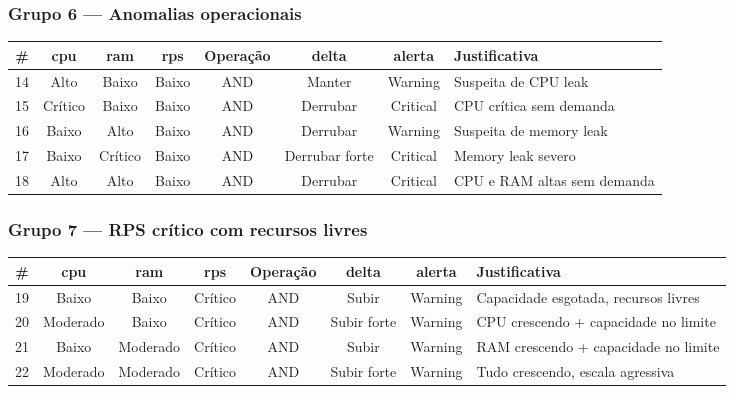 \documentclass[12pt, a4paper]{article}
\begin{document}
\subsubsection{Grupo 6 — Anomalias operacionais}
\begin{table}[H]
  \centering
  \begin{tabularx}{\textwidth}{cccccccX}
    \toprule
    \rowcolor{headerblue}
    \textbf{\#} & \textbf{cpu} & \textbf{ram} & \textbf{rps} & \textbf{Operação} & \textbf{delta} & \textbf{alerta} & \textbf{Justificativa} \\
    \midrule
    14 & Alto    & Baixo   & Baixo & AND & Manter         & Warning  & Suspeita de CPU leak \\
    15 & Crítico & Baixo   & Baixo & AND & Derrubar       & Critical & CPU crítica sem demanda \\
    16 & Baixo   & Alto    & Baixo & AND & Derrubar       & Warning  & Suspeita de memory leak \\
    17 & Baixo   & Crítico & Baixo & AND & Derrubar forte & Critical & Memory leak severo \\
    18 & Alto    & Alto    & Baixo & AND & Derrubar       & Critical & CPU e RAM altas sem demanda \\
    \bottomrule
  \end{tabularx}
\end{table}

\subsubsection{Grupo 7 — RPS crítico com recursos livres}
\begin{table}[H]
  \centering
  \begin{tabularx}{\textwidth}{cccccccX}
    \toprule
    \rowcolor{headerblue}
    \textbf{\#} & \textbf{cpu} & \textbf{ram} & \textbf{rps} & \textbf{Operação} & \textbf{delta} & \textbf{alerta} & \textbf{Justificativa} \\
    \midrule
    19 & Baixo    & Baixo    & Crítico & AND & Subir       & Warning & Capacidade esgotada, recursos livres \\
    20 & Moderado & Baixo    & Crítico & AND & Subir forte & Warning & CPU crescendo + capacidade no limite \\
    21 & Baixo    & Moderado & Crítico & AND & Subir       & Warning & RAM crescendo + capacidade no limite \\
    22 & Moderado & Moderado & Crítico & AND & Subir forte & Warning & Tudo crescendo, escala agressiva \\
    \bottomrule
  \end{tabularx}
\end{table}
\end{document}
